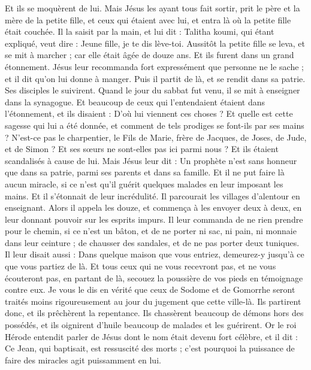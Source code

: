 \begin{multicols}{2}
Et ils se moquèrent de lui. Mais Jésus les ayant tous fait sortir, prit le père et la mère de la petite fille, et ceux qui étaient avec lui, et entra là où la petite fille était couchée.
Il la saisit par la main, et lui dit : Talitha koumi, qui étant expliqué, veut dire : Jeune fille, je te dis lève-toi.
Aussitôt la petite fille se leva, et se mit à marcher ; car elle était âgée de douze ans. Et ils furent dans un grand étonnement.
Jésus leur recommanda fort expressément que personne ne le sache ; et il dit qu'on lui donne à manger.
\VerseOne{}Puis il partit de là, et se rendit dans sa patrie. Ses disciples le suivirent.
Quand le jour du sabbat fut venu, il se mit à enseigner dans la synagogue. Et beaucoup de ceux qui l'entendaient étaient dans l'étonnement, et ils disaient : D'où lui viennent ces choses ? Et quelle est cette sagesse qui lui a été donnée, et comment de tels prodiges se font-ils par ses mains ?
N'est-ce pas le charpentier, le Fils de Marie, frère de Jacques, de Joses, de Jude, et de Simon ? Et ses sœurs ne sont-elles pas ici parmi nous ? Et ils étaient scandalisés à cause de lui.
Mais Jésus leur dit : Un prophète n'est sans honneur que dans sa patrie, parmi ses parents et dans sa famille.
Et il ne put faire là aucun miracle, si ce n'est qu'il guérit quelques malades en leur imposant les mains.
Et il s'étonnait de leur incrédulité. Il parcourait les villages d'alentour en enseignant.
Alors il appela les douze, et commença à les envoyer deux à deux, en leur donnant pouvoir sur les esprits impurs.
Il leur commanda de ne rien prendre pour le chemin, si ce n'est un bâton, et de ne porter ni sac, ni pain, ni monnaie dans leur ceinture ;
de chausser des sandales, et de ne pas porter deux tuniques.
Il leur disait aussi : Dans quelque maison que vous entriez, demeurez-y jusqu'à ce que vous partiez de là.
Et tous ceux qui ne vous recevront pas, et ne vous écouteront pas, en partant de là, secouez la poussière de vos pieds en témoignage contre eux. Je vous le dis en vérité que ceux de Sodome et de Gomorrhe seront traités moins rigoureusement au jour du jugement que cette ville-là.
Ils partirent donc, et ils prêchèrent la repentance.
Ils chassèrent beaucoup de démons hors des possédés, et ils oignirent d'huile beaucoup de malades et les guérirent.
Or le roi Hérode entendit parler de Jésus dont le nom était devenu fort célèbre, et il dit : Ce Jean, qui baptisait, est ressuscité des morts ; c'est pourquoi la puissance de faire des miracles agit puissamment en lui.

\end{multicols}
